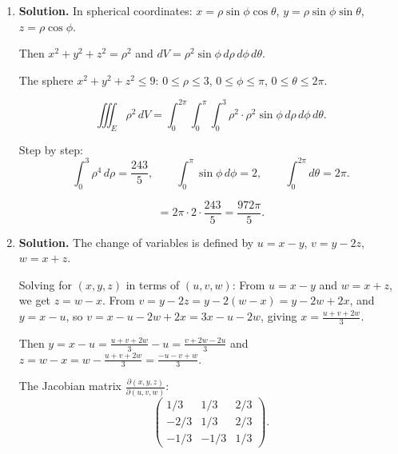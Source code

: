 \begin{enumerate}
Let $u,v\in[0,1]$ parameterize: $(x,y) = u(2,0)+v(1+a,2+a)$, so $x = 2u+(1+a)v$, $y = (2+a)v$.

From $y = (2+a)v$: $v = y/(2+a)$. Then $u = (x-(1+a)v)/2$.

Jacobian: $|J| = \begin{vmatrix}2 & 1+a \\ 0 & 2+a\end{vmatrix} = 2(2+a)$.

So $dx\,dy = 2(2+a)\,du\,dv$.

Also $x+y = 2u+(1+a)v+(2+a)v = 2u+(3+2a)v$.

\[
\boxed{\iint_R(x+y)\,dx\,dy = 2(2+a)\int_0^1\int_0^1\bigl[2u+(3+2a)v\bigr]\,du\,dv}.
\]

\item \textbf{Solution.}
In spherical coordinates: $x = \rho\sin\phi\cos\theta$, $y = \rho\sin\phi\sin\theta$, $z = \rho\cos\phi$.

Then $x^2+y^2+z^2 = \rho^2$ and $dV = \rho^2\sin\phi\,d\rho\,d\phi\,d\theta$.

The sphere $x^2+y^2+z^2\le 9$: $0\le\rho\le 3$, $0\le\phi\le\pi$, $0\le\theta\le 2\pi$.

\[
\iiint_E\rho^2\,dV = \int_0^{2\pi}\int_0^\pi\int_0^3\rho^2\cdot\rho^2\sin\phi\,d\rho\,d\phi\,d\theta.
\]

Step by step:
\[
\int_0^3\rho^4\,d\rho = \frac{243}{5}, \qquad \int_0^\pi\sin\phi\,d\phi = 2, \qquad \int_0^{2\pi}d\theta = 2\pi.
\]

\[
= 2\pi\cdot 2\cdot\frac{243}{5} = \boxed{\frac{972\pi}{5}}.
\]

\item \textbf{Solution.}
The change of variables is defined by $u = x-y$, $v = y-2z$, $w = x+z$.

Solving for $(x,y,z)$ in terms of $(u,v,w)$: From $u = x-y$ and $w = x+z$, we get $z = w-x$. From $v = y-2z = y-2(w-x) = y-2w+2x$, and $y = x-u$, so $v = x-u-2w+2x = 3x-u-2w$, giving $x = \frac{u+v+2w}{3}$.

Then $y = x-u = \frac{u+v+2w}{3}-u = \frac{v+2w-2u}{3}$ and $z = w-x = w-\frac{u+v+2w}{3} = \frac{-u-v+w}{3}$.

The Jacobian matrix $\frac{\partial(x,y,z)}{\partial(u,v,w)}$:
\[
\begin{pmatrix} 1/3 & 1/3 & 2/3 \\ -2/3 & 1/3 & 2/3 \\ -1/3 & -1/3 & 1/3\end{pmatrix}.
\]


\end{enumerate}
